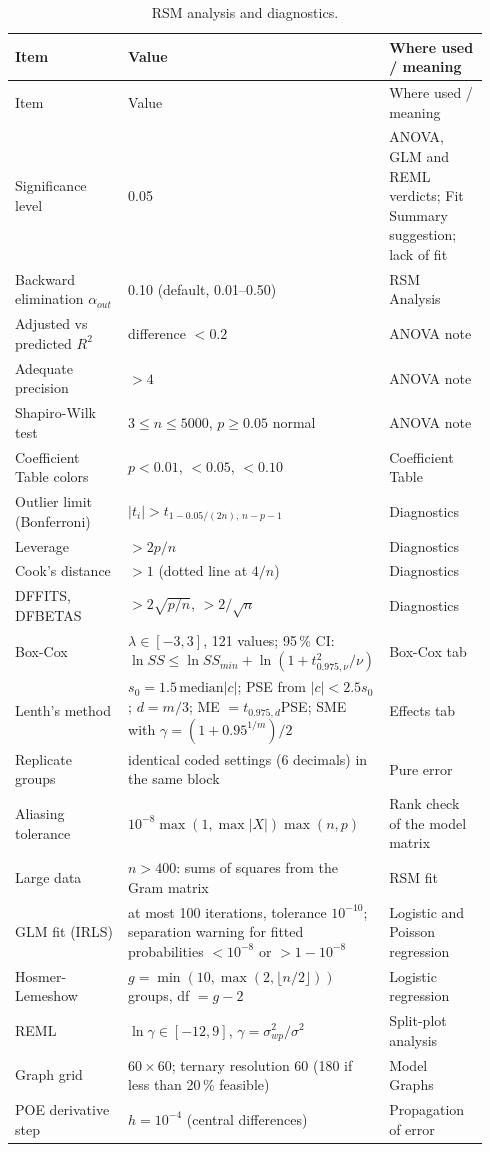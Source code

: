 {\small\begin{longtable}{@{}p{0.26\linewidth}p{0.46\linewidth}p{0.22\linewidth}@{}}
\caption{RSM analysis and diagnostics.}\label{tab:a-const-rsm}\\
\toprule
Item & Value & Where used / meaning \\
\midrule
\endfirsthead
\toprule
Item & Value & Where used / meaning \\
\midrule
\endhead
\bottomrule
\endfoot
Significance level & 0.05 & ANOVA, GLM and REML verdicts; Fit Summary suggestion; lack of fit \\
Backward elimination $\alpha_{out}$ & 0.10 (default, 0.01--0.50) & RSM Analysis \\
Adjusted vs predicted $R^2$ & difference $< 0.2$ & ANOVA note \\
Adequate precision & $> 4$ & ANOVA note \\
Shapiro-Wilk test & $3 \le n \le 5000$, $p \ge 0.05$ normal & ANOVA note \\
Coefficient Table colors & $p < 0.01$, $< 0.05$, $< 0.10$ & Coefficient Table \\
Outlier limit (Bonferroni) & $|t_i| > t_{1-0.05/(2n),\,n-p-1}$ & Diagnostics \\
Leverage & $> 2p/n$ & Diagnostics \\
Cook's distance & $> 1$ (dotted line at $4/n$) & Diagnostics \\
DFFITS, DFBETAS & $> 2\sqrt{p/n}$, $> 2/\sqrt{n}$ & Diagnostics \\
Box-Cox & $\lambda \in [-3, 3]$, 121 values; 95\,\% CI: $\ln SS \le \ln SS_{min} + \ln(1+t^2_{0.975,\nu}/\nu)$ &
  Box-Cox tab \\
Lenth's method & $s_0 = 1.5\,\mathrm{median}|c|$; PSE from $|c| < 2.5 s_0$; $d = m/3$; ME $= t_{0.975,d}$PSE;
  SME with $\gamma = (1+0.95^{1/m})/2$ & Effects tab \\
Replicate groups & identical coded settings (6 decimals) in the same block & Pure error \\
Aliasing tolerance & $10^{-8}\max(1,\max|X|)\max(n,p)$ & Rank check of the model matrix \\
Large data & $n > 400$: sums of squares from the Gram matrix & RSM fit \\
GLM fit (IRLS) & at most 100 iterations, tolerance $10^{-10}$; separation warning for fitted probabilities
  $< 10^{-8}$ or $> 1-10^{-8}$ & Logistic and Poisson regression \\
Hosmer-Lemeshow & $g = \min(10, \max(2, \lfloor n/2 \rfloor))$ groups, df $= g-2$ & Logistic regression \\
REML & $\ln\gamma \in [-12, 9]$, $\gamma = \sigma^2_{wp}/\sigma^2$ & Split-plot analysis \\
Graph grid & $60 \times 60$; ternary resolution 60 (180 if less than 20\,\% feasible) & Model Graphs \\
POE derivative step & $h = 10^{-4}$ (central differences) & Propagation of error \\
\end{longtable}}

